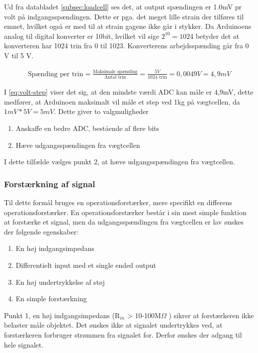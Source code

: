 Ud fra databladet \ref{subsec:loadcell} ses det, at output spændingen er 1.0mV pr volt på indgangsspændingen. Dette er pga. det meget lille strain der tilføres til emnet, hvilket også er med til at strain gagene ikke går i stykker. Da Arduinoens analog til digital konverter er 10bit, hvilket vil sige $2^{10}=1024$  betyder det at konverteren har 1024 trin fra 0 til 1023. Konverterens arbejdsspænding går fra 0 V til 5 V. 

\begin{align}
 \text{Spænding per trin}=\frac{\text{Maksimale spænding}}{\text{Antal trin}}=\frac{5 V}{1024\text{ trin}}=0,0049V=4,9mV
 \label{eq:volt-step}
 \end{align}
 
I \ref{eq:volt-step} viser det sig, at den mindste værdi ADC kan måle er 4,9mV, dette medfører, at Arduinoen maksimalt vil måle et step ved 1kg på vægtcellen, da $1mV*5V=5mV$. Dette giver to valgmuligheder
\begin{enumerate}
\item Anskaffe en bedre ADC, bestående af flere bits
\item Hæve udgangsspændingen fra vægtcellen 
\end{enumerate}
I dette tilfælde vælges punkt 2, at hæve udgangsspændingen fra vægtcellen. 
\subsubsection{Forstærkning af signal}
Til dette formål bruges en operationsforstærker, mere specifikt en differens operationsforstærker. En operationsforstærker består i sin mest simple funktion at forstærke et signal, men da udgangsspændingen fra vægtcellen er lav ønskes der følgende egenskaber:
\begin{enumerate}
\item En høj indgangsimpedans 
\item Differentielt input med et single ended output
\item En høj undertrykkelse af støj
\item En simple forstærkning
\end{enumerate}
Punkt 1, en høj indgangsimpedans (R$_{in}$ > 10-100M$\Omega$ ) sikrer at forstærkeren ikke belaster måle objektet. Det ønskes ikke at signalet undertrykkes ved, at forstærkeren forbruger strømmen fra signalet for. Derfor ønskes der adgang til hele signalet.

